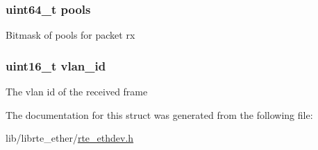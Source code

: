 \subsubsection[{pools}]{\setlength{\rightskip}{0pt plus 5cm}uint64\+\_\+t pools}\label{structrte__eth__vmdq__dcb__conf_a541271d53b15080c2cb0aedb4364572c}
Bitmask of pools for packet rx \hypertarget{structrte__eth__vmdq__dcb__conf_ad9a532da576820f8630b96c16692aa5a}{}
\subsubsection[{vlan\+\_\+id}]{\setlength{\rightskip}{0pt plus 5cm}uint16\+\_\+t vlan\+\_\+id}\label{structrte__eth__vmdq__dcb__conf_ad9a532da576820f8630b96c16692aa5a}
The vlan id of the received frame 

The documentation for this struct was generated from the following file\+:\begin{DoxyCompactItemize}
\item 
lib/librte\+\_\+ether/\hyperlink{rte__ethdev_8h}{rte\+\_\+ethdev.\+h}\end{DoxyCompactItemize}
